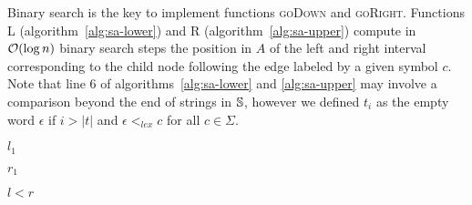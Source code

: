 Binary search is the key to implement functions \textsc{goDown} and \textsc{goRight}.
Functions \textsc{L} (algorithm~\ref{alg:sa-lower}) and \textsc{R} (algorithm~\ref{alg:sa-upper}) compute in $\mathcal{O}(\log{n})$ binary search steps the position in $A$ of the left and right interval corresponding to the child node following the edge labeled by a given symbol $c$.
Note that line 6 of algorithms~\ref{alg:sa-lower} and \ref{alg:sa-upper} may involve a comparison beyond the end of strings in $\mathbb {S}$, however we defined $t_i$ as the empty word $\epsilon$ if $i > |t|$ and $\epsilon <_{lex} c$ for all $c \in \Sigma$.

\begin{algorithm}[h!]
\begin{minipage}[t]{.5\textwidth}
\label{alg:sa-lower}
\begin{algorithmic}[1]
		\Else
		\EndIf
	\EndWhile
	\State \Return $l_1$
\EndProcedure
\end{algorithmic}
\end{minipage}
\hfill
\begin{minipage}[t]{.5\textwidth}
\label{alg:sa-upper}
\begin{algorithmic}[1]
		\Else
		\EndIf
	\EndWhile
	\State \Return $r_1$
\EndProcedure
\end{algorithmic}
\end{minipage}
\end{algorithm}

\begin{algorithm}[h!]
\begin{minipage}[t]{.5\textwidth}
\begin{algorithmic}[1]
\EndProcedure
\end{algorithmic}
\end{minipage}
\begin{minipage}[t]{.5\textwidth}
\begin{algorithmic}[1]
		\State \Return \False
	\EndIf
	\State \Return $l < r$
\EndProcedure
\end{algorithmic}
\end{minipage}
\end{algorithm}


